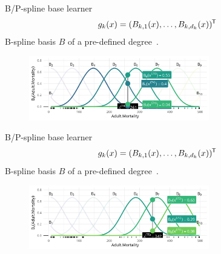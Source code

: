 \begin{frame}{B/P-spline base learner}
  \vspace{-0.3cm}\[g_k(x) = (B_{k,1}(x), \dots, B_{k,d_k}(x))^{\mkern-1.5mu\mathsf{T}}\] B-spline basis $B$ of a pre-defined degree~\citep{eilers1996flexible}.
  \begin{center}
    \begin{figure}
      \includegraphics[width=0.7\textwidth]{figures/bs-base/fig-bs5.png}
    \end{figure}
  \end{center}
  \vspace{-0.3cm}
  
  \addtocounter{framenumber}{-1}
\end{frame}


\begin{frame}{B/P-spline base learner}
  \vspace{-0.3cm}\[g_k(x) = (B_{k,1}(x), \dots, B_{k,d_k}(x))^{\mkern-1.5mu\mathsf{T}}\] B-spline basis $B$ of a pre-defined degree~\citep{eilers1996flexible}.
  \begin{center}
    \begin{figure}
      \includegraphics[width=0.7\textwidth]{figures/bs-base/fig-bs10.png}
    \end{figure}
  \end{center}
  \vspace{-0.3cm}
  
  \addtocounter{framenumber}{-1}
\end{frame}

